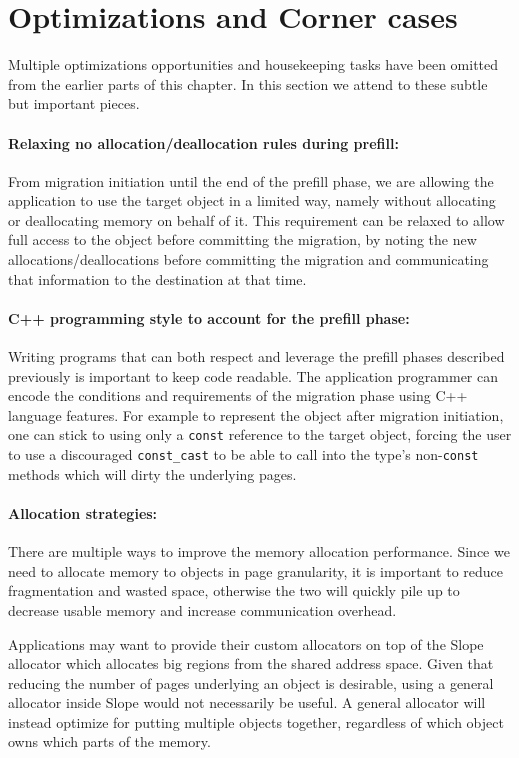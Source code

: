 \section{Optimizations and Corner cases}
\label{sec:optim}
Multiple optimizations opportunities and housekeeping tasks have been omitted
from the earlier parts of this chapter. In this section we attend to these
subtle but important pieces.

\paragraph{Relaxing no allocation/deallocation rules during prefill:}
From migration initiation until the end of the prefill phase, we are allowing
the application to use the target object in a limited way, namely without
allocating or deallocating memory on behalf of it. This requirement can be
relaxed to allow full access to the object before committing the
migration, by noting the new allocations/deallocations before committing the
migration and communicating that information to the destination at that time.

\paragraph{C++ programming style to account for the prefill phase:}
\label{sec:conform}
Writing programs that can both respect and leverage the prefill phases
described previously is important to keep code readable. The application
programmer can encode the
conditions and requirements of the migration phase using C++ language features.
For example to represent the object after migration initiation, one can
stick to using only a \texttt{const} reference to the target object,
forcing the user to use a discouraged \texttt{const\_cast} to be able to call
into the type's non-\texttt{const} methods which will dirty the underlying pages.

\paragraph{Allocation strategies:} There are multiple ways to improve the memory
allocation performance. Since we need to allocate memory to objects in page
granularity, it is important to reduce fragmentation and wasted space,
otherwise the two will quickly pile up to decrease usable memory and increase
communication overhead.

Applications may want to provide their custom allocators on top of the Slope
allocator which allocates big regions from the shared address space. Given that
reducing the number of pages underlying an object is desirable, using a general
allocator inside Slope would not necessarily be useful. A general allocator
will instead optimize for putting multiple objects together, regardless of which
object owns which parts of the memory.

